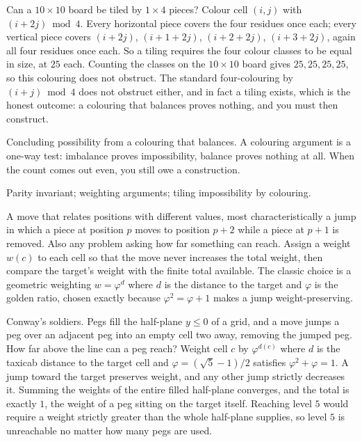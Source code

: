 \begin{worked}
Can a $10\times10$ board be tiled by $1\times4$ pieces? Colour cell $(i,j)$ with $(i+2j)\bmod 4$. Every horizontal piece covers the four residues once each; every vertical piece covers $(i+2j)$, $(i+1+2j)$, $(i+2+2j)$, $(i+3+2j)$, again all four residues once each. So a tiling requires the four colour classes to be equal in size, at $25$ each. Counting the classes on the $10\times10$ board gives $25,25,25,25$, so this colouring does not obstruct. The standard four-colouring by $(i+j)\bmod 4$ does not obstruct either, and in fact a tiling exists, which is the honest outcome: a colouring that balances proves nothing, and you must then construct.
\end{worked}

\begin{trap}
Concluding possibility from a colouring that balances. A colouring argument is a one-way test: imbalance proves impossibility, balance proves nothing at all. When the count comes out even, you still owe a construction.
\end{trap}

\begin{seealsob}Parity invariant; weighting arguments; tiling impossibility by colouring.\end{seealsob}

\cue A move that relates positions with different values, most characteristically a jump in which a piece at position $p$ moves to position $p+2$ while a piece at $p+1$ is removed. Also any problem asking how far something can reach.
\method Assign a weight $w(c)$ to each cell so that the move never increases the total weight, then compare the target's weight with the finite total available. The classic choice is a geometric weighting $w=\varphi^{d}$ where $d$ is the distance to the target and $\varphi$ is the golden ratio, chosen exactly because $\varphi^{2}=\varphi+1$ makes a jump weight-preserving.

\begin{worked}
Conway's soldiers. Pegs fill the half-plane $y\leq0$ of a grid, and a move jumps a peg over an adjacent peg into an empty cell two away, removing the jumped peg. How far above the line can a peg reach? Weight cell $c$ by $\varphi^{d(c)}$ where $d$ is the taxicab distance to the target cell and $\varphi=(\sqrt5-1)/2$ satisfies $\varphi^{2}+\varphi=1$. A jump toward the target preserves weight, and any other jump strictly decreases it. Summing the weights of the entire filled half-plane converges, and the total is exactly $1$, the weight of a peg sitting on the target itself. Reaching level $5$ would require a weight strictly greater than the whole half-plane supplies, so level $5$ is unreachable no matter how many pegs are used.
\end{worked}

